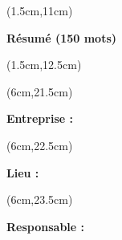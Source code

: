 \begin{titlepage}
    \begin{textblock*}{18cm}(1.5cm,11cm)
        \begin{center}
            \normalsize
            \textbf{\textcolor{bleuRoiUTT}{Résumé (150 mots)}}
        \end{center}
    \end{textblock*}

    \begin{textblock*}{18cm}(1.5cm,12.5cm)
        {
            \normalsize
            \setlength{\parindent}{0pt}
            \titletext
        }
    \end{textblock*}


    \begin{textblock*}{8.5cm}(6cm,21.5cm)
        \normalsize
        \raggedright
        \justify
        \textbf{\textcolor{bleuRoiUTT}{Entreprise :} \theEntreprise}
    \end{textblock*}

    \begin{textblock*}{8.5cm}(6cm,22.5cm)
        \normalsize
        \raggedright
        \justify
        \textbf{\textcolor{bleuRoiUTT}{Lieu :} \textit{\mapAddr{\theLieu}}}
    \end{textblock*}

    \begin{textblock*}{8.5cm}(6cm,23.5cm)
        \normalsize
        \raggedright
        \justify
        \textbf{\textcolor{bleuRoiUTT}{Responsable :} \theREntre}
    \end{textblock*}

\end{titlepage}

\clearpage %
